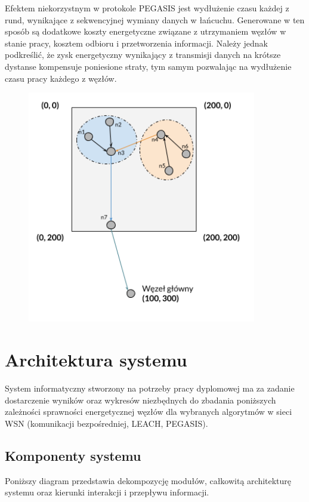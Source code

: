 \documentclass[a4paper,12pt,twoside,openany]{report}
\begin{document}
Efektem niekorzystnym w protokole PEGASIS jest wydłużenie czasu każdej z rund, wynikające z sekwencyjnej wymiany danych w łańcuchu.
Generowane w ten sposób są dodatkowe koszty energetyczne związane z utrzymaniem węzłów w stanie pracy, kosztem odbioru i przetworzenia informacji.
Należy jednak podkreślić, że zysk energetyczny wynikający z transmisji danych na krótsze dystanse kompensuje poniesione straty, tym samym pozwalając na wydłużenie czasu pracy każdego z węzłów.

\begin{figure}[H]
 \centering
 \includegraphics[width=10cm]{images/komunikacja_pegasis.png} 
\end{figure}

\chapter{Architektura systemu}

System informatyczny stworzony na potrzeby pracy dyplomowej ma za zadanie dostarczenie wyników oraz wykresów niezbędnych do zbadania poniższych zależności sprawności energetycznej 
węzłów dla wybranych algorytmów w sieci WSN (komunikacji bezpośredniej, LEACH, PEGASIS).

\section{Komponenty systemu}

Poniższy diagram przedstawia dekompozycję modułów, całkowitą architekturę systemu oraz kierunki interakcji i przepływu informacji.
\end{document}
